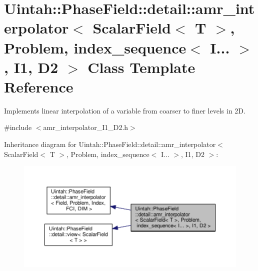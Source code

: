 \hypertarget{classUintah_1_1PhaseField_1_1detail_1_1amr__interpolator_3_01ScalarField_3_01T_01_4_00_01Problemd2db9de1754b5450c93c191a9275f5ed}{}\section{Uintah\+:\+:Phase\+Field\+:\+:detail\+:\+:amr\+\_\+interpolator$<$ Scalar\+Field$<$ T $>$, Problem, index\+\_\+sequence$<$ I... $>$, I1, D2 $>$ Class Template Reference}
\label{classUintah_1_1PhaseField_1_1detail_1_1amr__interpolator_3_01ScalarField_3_01T_01_4_00_01Problemd2db9de1754b5450c93c191a9275f5ed}


Implements linear interpolation of a variable from coarser to finer levels in 2D.  




{\ttfamily \#include $<$amr\+\_\+interpolator\+\_\+\+I1\+\_\+\+D2.\+h$>$}



Inheritance diagram for Uintah\+:\+:Phase\+Field\+:\+:detail\+:\+:amr\+\_\+interpolator$<$ Scalar\+Field$<$ T $>$, Problem, index\+\_\+sequence$<$ I... $>$, I1, D2 $>$\+:\nopagebreak
\begin{figure}[H]
\begin{center}
\leavevmode
\includegraphics[width=350pt]{classUintah_1_1PhaseField_1_1detail_1_1amr__interpolator_3_01ScalarField_3_01T_01_4_00_01Problem6a5a099c3b36d5203324e5b7f8662e42}
\end{center}
\end{figure}


